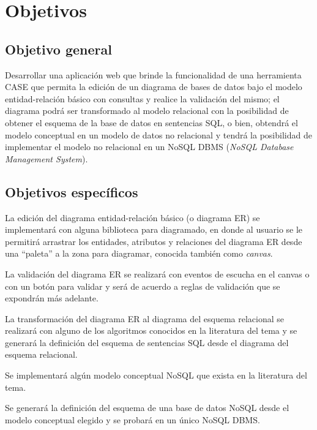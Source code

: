 \section{Objetivos}

\subsection*{Objetivo general}
Desarrollar una aplicación web que brinde la funcionalidad de una herramienta CASE que permita la edición de un diagrama de bases de datos bajo el modelo entidad-relación básico con consultas y realice la validación del mismo; el diagrama podrá ser transformado al modelo relacional con la posibilidad de obtener el esquema de la base de datos en sentencias SQL, o bien, obtendrá el modelo conceptual en un modelo de datos no relacional y tendrá la posibilidad de implementar el modelo no relacional en un NoSQL DBMS (\textit{NoSQL Database Management System}).

\subsection*{Objetivos específicos}

La edición del diagrama entidad-relación básico (o diagrama ER) se implementará con alguna biblioteca para diagramado, en donde al usuario se le permitirá arrastrar los entidades, atributos y relaciones del diagrama ER desde una ``paleta''  a la zona para diagramar, conocida también como \textit{canvas}.


La validación del diagrama ER se realizará con eventos de escucha en el canvas o con un botón para validar y será de acuerdo a reglas de validación que se expondrán más adelante.


La transformación del diagrama ER al diagrama del esquema relacional se realizará con alguno de los algoritmos conocidos en la literatura del tema y se generará la definición del esquema de sentencias SQL desde el diagrama del esquema relacional.


Se implementará algún modelo conceptual NoSQL que exista en la literatura del tema.


Se generará la definición del esquema de una base de datos NoSQL desde el modelo conceptual elegido y se probará en un único NoSQL DBMS.